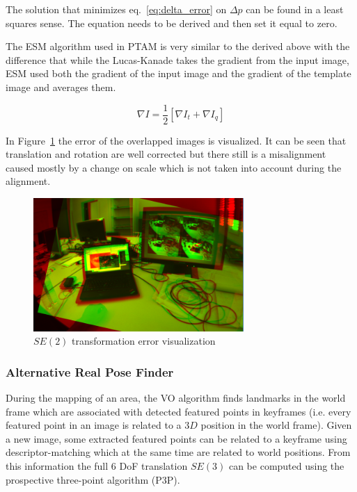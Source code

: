 The solution that minimizes eq.~\ref{eq:delta_error}  on $\Delta p$ can be found in a least squares sense. The equation needs to be derived and then set it equal to zero. 

The ESM algorithm used in PTAM is very similar to the derived above with the difference that while the Lucas-Kanade takes the gradient from the input image, ESM used both the gradient of the input image and the gradient of the template image and averages them.

\begin{equation}
  \nabla I = \frac{1}{2} \left[\nabla I_t + \nabla I_q \right]
\end{equation}

In Figure~\ref{fig:se3_error_1} the error of the overlapped images is visualized. It can be seen that translation and rotation are well corrected but there still is a misalignment caused mostly by a change on scale which is not taken into account during the alignment.\\


\begin{figure}[htpb]
  \centering
  \includegraphics[width=8cm]{img/se2_error_1.png}
  \caption{$SE(2)$ transformation error visualization}
  \label{fig:se3_error_1}
\end{figure}


\subsubsection{Alternative Real Pose Finder}
\label{ssub:real_pose_finder_alternative}

During the mapping of an area, the VO algorithm finds landmarks in the world frame which are associated with detected featured points in keyframes (i.e. every featured point in an image is related to a $3D$ position in the world frame). Given a new image, some extracted featured points can be related to a keyframe using descriptor-matching which at the same time are related to world positions. From this information the full 6 DoF translation $SE(3)$ can be computed using the prospective three-point algorithm (P3P).\\

